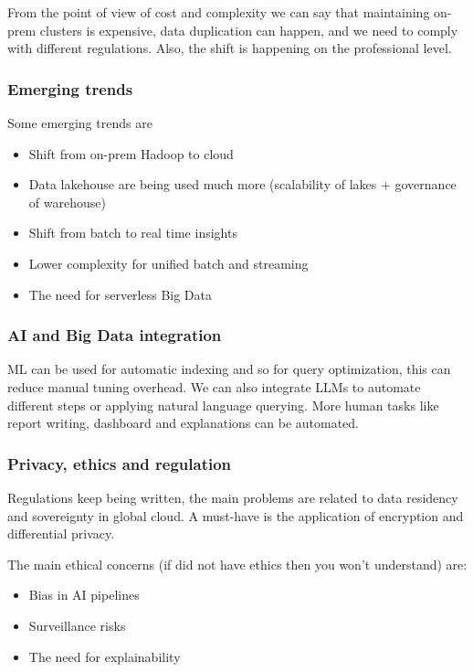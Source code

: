 \vspace{10pt}

From the point of view of cost and complexity we can say that maintaining on-prem clusters is expensive, data duplication can happen, and we need to comply with different regulations. Also, the shift is happening on the professional level. 

\subsubsection{Emerging trends}

Some emerging trends are

\begin{itemize}
    \item Shift from on-prem Hadoop to cloud
    \item Data lakehouse are being used much more (scalability of lakes + governance of warehouse)
    \item Shift from batch to real time insights
    \item Lower complexity for unified batch and streaming
    \item The need for serverless Big Data
\end{itemize}

\subsubsection{AI and Big Data integration}

ML can be used for automatic indexing and so for query optimization, this can reduce manual tuning overhead. We can also integrate LLMs to automate different steps or applying natural language querying. More human tasks like report writing, dashboard and explanations can be automated. 

\subsubsection{Privacy, ethics and regulation} 

Regulations keep being written, the main problems are related to data residency and sovereignty in global cloud. A must-have is the application of encryption and differential privacy. 

\vspace{10pt}

The main ethical concerns (if did not have ethics then you won't understand) are:

\begin{itemize}
    \item Bias in AI pipelines
    \item Surveillance risks
    \item The need for explainability
\end{itemize}

